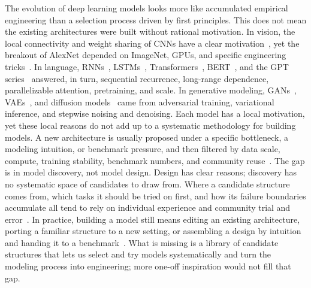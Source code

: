 \documentclass[11pt]{article}
\theoremstyle{definition}
\theoremstyle{plain}
\begin{document}
The evolution of deep learning models looks more like accumulated empirical engineering
than a selection process driven by first principles. This does not mean the existing
architectures were built without rational motivation. In vision, the local connectivity
and weight sharing of CNNs have a clear motivation~\citep{lecun1998gradient}, yet the
breakout of AlexNet depended on ImageNet, GPUs, and specific engineering
tricks~\citep{krizhevsky2012imagenet}. In language, RNNs~\citep{elman1990finding},
LSTMs~\citep{hochreiter1997long}, Transformers~\citep{vaswani2017attention},
BERT~\citep{devlin2019bert}, and the GPT series~\citep{brown2020language} answered, in turn,
sequential recurrence, long-range dependence, parallelizable attention, pretraining, and
scale. In generative modeling, GANs~\citep{goodfellow2014generative},
VAEs~\citep{kingma2014autoencoding}, and diffusion
models~\citep{sohldickstein2015deep, ho2020denoising} came from adversarial training,
variational inference, and stepwise noising and denoising. Each model has a local
motivation, yet these local reasons do not add up to a systematic methodology for building
models. A new architecture is usually proposed under a specific bottleneck, a modeling
intuition, or benchmark pressure, and then filtered by data scale, compute, training
stability, benchmark numbers, and community reuse~\citep{lipton2018troubling}. The gap is in
model discovery, not model design. Design has clear reasons; discovery has no systematic
space of candidates to draw from. Where a candidate structure comes from, which tasks it
should be tried on first, and how its failure boundaries accumulate all tend to rely on
individual experience and community trial and error~\citep{elsken2019neural}. In practice,
building a model still means editing an existing architecture, porting a familiar structure
to a new setting, or assembling a design by intuition and handing it to a
benchmark~\citep{he2021automl,radosavovic2020designing}. What is missing is a library of
candidate structures that lets us select and try models systematically and turn the
modeling process into engineering; more one-off inspiration would not fill that gap.
\end{document}
